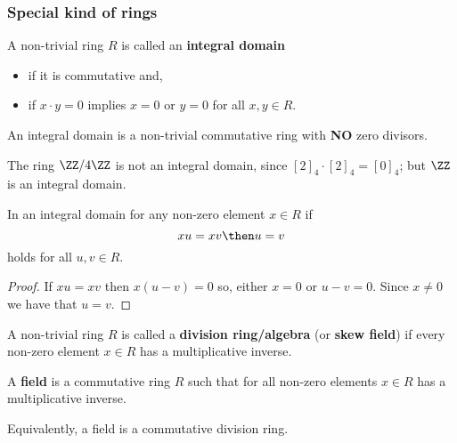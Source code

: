 \documentclass[12pt, a4paper]{article}
\begin{document}
\subsubsection{Special kind of rings}

\begin{definition}
    A non-trivial ring \(R\) is called an \textbf{integral domain} \begin{itemize}
        \item if it is commutative and, 
        \item if \(x \cdot y =0\) implies \(x=0\) or \(y=0\) for all \(x,y\in R\).
    \end{itemize}
\end{definition}

\begin{mdremark}
    An integral domain is a non-trivial commutative ring with \textbf{NO} zero divisors.
\end{mdremark}

\begin{example}
    The ring \(\ZZ/4\ZZ\) is not an integral domain, since \([2]_4\cdot [2]_4=[0]_4\); but \(\ZZ\) is an integral domain.
\end{example}

\begin{mdprop}
    In an integral domain for any non-zero element \(x \in R\) if
    \[xu=xv \then u=v\]
    holds for all \(u,v \in R\).
\end{mdprop}

\begin{proof}
    If \(xu=xv\) then \(x(u-v)=0\) so, either \(x =0\) or \(u-v=0\). Since \(x \neq 0\) we have that \(u=v\).
\end{proof}

\begin{definition}
    A non-trivial ring \(R\) is called a \textbf{division ring/algebra} (or \textbf{skew field}) if every non-zero element \(x \in R\) has a multiplicative inverse. 
\end{definition}

\begin{definition}
    A \textbf{field} is a commutative ring \(R\) such that for all non-zero elements \(x \in R\) has a multiplicative inverse.
\end{definition}

\begin{mdnote}
    Equivalently, a field is a commutative division ring.
\end{mdnote}
\end{document}
